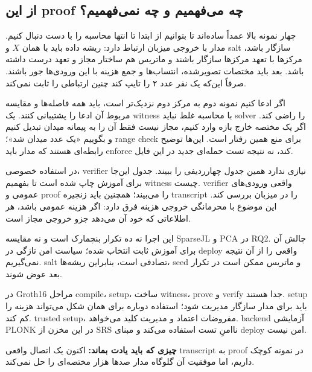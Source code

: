 \documentclass[11pt,a4paper]{article}
\newcommand{\takeaway}[1]{\par\textbf{چیزی که باید یادت بماند:} #1\par}
\begin{document}
\clearpage\subsection{از این proof چه می‌فهمیم و چه نمی‌فهمیم؟}
چهار نمونه بالا عمداً ساده‌اند تا بتوانیم از ابتدا تا انتها محاسبه را با دست دنبال کنیم. مدار با خروجی میزبان ارتباط دارد: ریشه داده باید با همان \(X\) و salt سازگار باشد، مرکزها با تعهد مرکزها سازگار باشند و ماتریس هم ساختار مجاز و تعهد درست داشته باشد. بعد باید مختصات تصویرشده، انتساب‌ها و جمع هزینه با این ورودی‌ها جور باشند. صرفاً این‌که یک نفر عدد ۲ را تایپ کند چنین ارتباطی را ثابت نمی‌کند.

اگر ادعا کنیم نمونه دوم به مرکز دوم نزدیک‌تر است، باید همه فاصله‌ها و مقایسه مربوط آن ادعا را پشتیبانی کنند. یک witness با محاسبه غلط نباید solver را راضی کند. اگر یک مختصه خارج بازه وارد کنیم، مجاز نیست فقط آن را به پیمانه میدان تبدیل کنیم و بگوییم «یک عدد میدان شد»؛ range check برای منع همین رفتار است. این‌ها توضیح رابطه‌ای هستند که مدار باید enforce کند، نه نتیجه تست حمله‌ای جدید در این فایل.

در استفاده خصوصی، verifier نیازی ندارد همین جدول چهارردیفی را ببیند. جدول این‌جا برای آموزش چاپ شده است تا بفهمیم witness چیست. verifier واقعی ورودی‌های عمومی و proof را می‌بیند؛ همچنین باید زنجیره transcript را در میزبان بررسی کند. این موضوع با محرمانگی خروجی هزینه فرق دارد: اگر هزینه عمومی باشد، هر اطلاعاتی که خود آن می‌دهد جزو خروجی مجاز است.

این اجرا نه ده تکرار بنچمارک است و نه مقایسه SparseJL و PCA در RQ2. چالش آن برای آموزش ثابت انتخاب شده؛ سیاست امن تازگی در deploy واقعی را از آن نتیجه نمی‌گیریم. salt تصادفی است، بنابراین ریشه‌ها، seed و ماتریس ممکن است در تکرار بعد عوض شوند.

در Groth16 مراحل compile، setup، ساخت witness، prove و verify جدا هستند. setup باید برای مدار سازگار مدیریت شود؛ استفاده دوباره برای همان شکل می‌تواند هزینه را کم کند. trusted setup، مفروضات اعتماد و مدیریت کلید می‌خواهد. backend آزمایشی PLONK در این مخزن از SRS ناامنِ تست استفاده می‌کند و مبنای deploy امن نیست.

\takeaway{اکنون یک اتصال واقعی transcript به proof در نمونه کوچک داریم، اما موفقیت آن گلوگاه مدار صدها هزار مختصه‌ای را حل نمی‌کند.}
\end{document}
